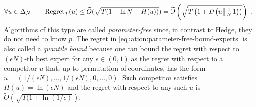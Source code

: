 \[
\forall u \in \Delta_N \qquad \operatorname{Regret}_T(u) \le \widetilde O(\sqrt{T (1 + \ln N - H(u))}) = \widetilde O\left(\sqrt{T \left(1 + D\left({u}\middle\|{\tfrac{1}{N}\mathbf{1}}\right) \right)} \right) \; .
\]
Algorithms of this type are called \emph{parameter-free} since, in contrast to
Hedge, they do not need to know $p$. The regret in
\eqref{equation:parameter-free-bound-experts} is also called a \emph{quantile bound}
because one can bound the regret with respect to $(\epsilon N)$-th best expert
for any $\epsilon \in (0,1)$ as the regret with respect to
a competitor $u$ that, up to permutation of coordinates, has the form
$
u = \left( 1/(\epsilon N), \dots, 1/(\epsilon N), 0, \dots, 0 \right)
$.
Such competitor satisfies $H(u) = \ln (\epsilon N)$ and the regret with respect
to any such $u$ is $\widetilde O(\sqrt{T (1 + \ln(1/\epsilon)})$.
